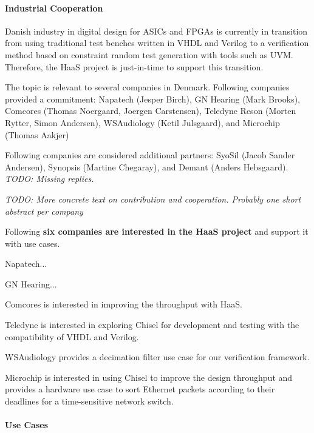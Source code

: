\documentclass[fleqn,12pt]{article}
\newcommand{\todo}[1]{{\it TODO: #1}}
\begin{document}
\paragraph*{Industrial Cooperation}

Danish industry in digital design for ASICs and FPGAs is currently in transition from using traditional
test benches written in VHDL and Verilog to a verification method based on constraint random
test generation with tools such as UVM. Therefore, the HaaS project is just-in-time to support this
transition.

The topic is relevant to several companies in Denmark. Following companies provided a commitment: Napatech (Jesper Birch), GN Hearing (Mark Brooks), Comcores (Thomas Noergaard, Joergen Carstensen), Teledyne Reson (Morten Rytter, Simon Andersen), WSAudiology (Ketil Julsgaard), and Microchip (Thomas Aakjer)


Following companies are considered additional partners: SyoSil (Jacob Sander Andersen), Synopsis (Martine Chegaray), and Demant (Anders Hebsgaard).
\todo{Missing replies.}

\todo{More concrete text on contribution and cooperation. Probably one short abstract per company}

Following {\bf six companies are interested in the HaaS project} and support it with use cases.

Napatech...

GN Hearing...

Comcores is interested in improving the throughput with HaaS.

Teledyne is interested in exploring Chisel for development and testing with the compatibility of VHDL and Verilog.

WSAudiology provides a decimation filter use case for our verification framework.

Microchip is interested in using Chisel to improve the design throughput and
provides a hardware use case to sort Ethernet packets according to their deadlines
for a time-sensitive network switch.



\paragraph*{Use Cases}
\end{document}
